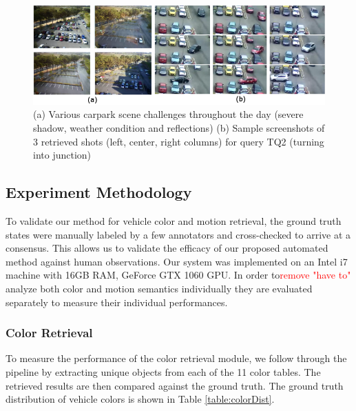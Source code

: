 \documentclass[runningheads]{llncs}
\newcommand\tab[1][1cm]{\hspace*{#1}}
\newcommand{\ian}[1]{\textcolor{red}{#1}}
\newcommand{\ian}[1]{}   %
\begin{document}
\begin{figure}
    \centering
    \includegraphics[width=\textwidth]{Images/sceneNresult.PNG}
    \caption{(a) Various carpark scene challenges throughout the day (severe shadow, weather condition and reflections)  (b) Sample screenshots of 3 retrieved shots (left, center, right columns) for query TQ2 (turning into junction)}
    \vspace{-1em}
    \label{fig:challenges}
\end{figure}

\subsection{Experiment Methodology}

To validate our method for vehicle color and motion retrieval, the ground truth states were manually labeled by a few annotators and cross-checked to arrive at a consensus. This allows us to validate the efficacy of our proposed automated method against human observations.
Our system was implemented on an Intel i7 machine with 16GB RAM, GeForce GTX 1060 GPU.
In order to\ian{remove "have to"} analyze both color and motion semantics individually 
they are evaluated separately to measure their individual performances. 

\subsubsection{Color Retrieval} \tab

To measure the performance of the color retrieval module, we follow through the pipeline by extracting unique objects from each of the 11 color tables. 
The retrieved results are then compared against the ground truth. The ground truth distribution of vehicle colors is shown in Table \ref{table:colorDist}.
\end{document}
